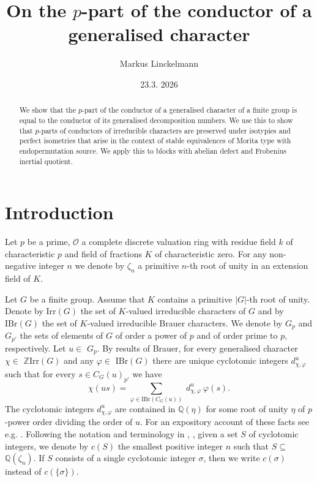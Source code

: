 \documentclass{amsart} %
\title{On the $p$-part of the conductor of a generalised character}
\author{Markus Linckelmann}
\date{23.3. 2026}
\theoremstyle{plain}\newtheorem{Theorem}{Theorem}[section]
\theoremstyle{plain}\newtheorem{Conjecture}[Theorem]{Conjecture}
\theoremstyle{plain}\newtheorem{Corollary}[Theorem]{Corollary}
\theoremstyle{plain}\newtheorem{Lemma}[Theorem]{Lemma}
\theoremstyle{plain}\newtheorem{Proposition}[Theorem]{Proposition}
\theoremstyle{definition}\newtheorem{Definition}[Theorem]{Definition}
\theoremstyle{definition}\newtheorem{Example}[Theorem]{Example}
\theoremstyle{definition}\newtheorem{Examples}[Theorem]{Examples}
\theoremstyle{definition}\newtheorem{Remark}[Theorem]{Remark}
\theoremstyle{definition}\newtheorem{Remarks}[Theorem]{Remarks}
\theoremstyle{plain}\newtheorem{Statement}[Theorem]{}
\def\CO{{\mathcal{O}}}
\def\Q{{\mathbb Q}}               \def\bV{\mathbf{V}}
\def\Z{{\mathbb Z}}
\def\IBr{\mathrm{IBr}}
\def\Irr{\mathrm{Irr}}           \def\tenK{\otimes_K}
\begin{document}
\maketitle  %

\begin{abstract}
We show that the $p$-part of the conductor of a generalised  character of a finite
group is equal to the conductor of its generalised decomposition numbers.
We use this to show that $p$-parts of conductors of irreducible characters 
are preserved under isotypies and perfect isometries that arise in the context of  
stable  equivalences of Morita type with endopermutation source. 
 We  apply this  to blocks with abelian defect and Frobenius inertial quotient. 
\end{abstract}

\section{Introduction} %

Let $p$ be a prime, $\CO$ a complete discrete valuation ring with residue
field $k$ of characteristic $p$ and field of fractions $K$ of characteristic zero.
For any non-negative integer $n$ we denote by $\zeta_n$ a primitive $n$-th
root of unity in an extension field of $K$.

\medskip
Let $G$ be a finite group. Assume that $K$ contains a primitive $|G|$-th root 
of unity. Denote by $\Irr(G)$ the set of $K$-valued irreducible characters of $G$
and by $\IBr(G)$ the set of $K$-valued irreducible Brauer characters. 
We denote by $G_p$ and $G_{p'}$ the sets of elements of $G$ of order
a power of $p$ and of order prime to $p$, respectively.
 Let $u\in $ $G_p$. By results of Brauer, for every generalised character
 $\chi\in$ $\Z\Irr(G)$ and any $\varphi\in$ $\IBr(G)$ there are unique cyclotomic integers
$d^u_{\chi,\varphi}$  such that for  every $s\in C_G(u)_{p'}$  we have 
$$\chi(us) = \sum_{\varphi\in\IBr(C_G(u))}\ d^u_{\chi,\varphi} \ \varphi(s).$$
The cyclotomic integers $d^u_{\chi,\varphi}$ are 
contained in $\Q(\eta)$ for some root of unity $\eta$ of $p$-power order
dividing the order of $u$. For an expository account of these facts see
e.g. \cite[\S 5.15]{LiBookI}. Following the notation and terminology in
\cite{NT21}, \cite{HungFry}, 
given a  set $S$ of cyclotomic integers, we denote by $c(S)$ the
smallest positive integer $n$ such that $S\subseteq$ $\Q(\zeta_n)$.
If $S$ consists of a single cyclotomic integer $\sigma$, then we write
$c(\sigma)$ instead of $c(\{\sigma\})$. 
\end{document}
